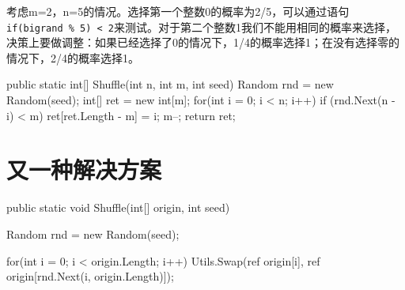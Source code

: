 考虑m=2，n=5的情况。选择第一个整数0的概率为2/5，可以通过语句\lstinline!if(bigrand % 5) < 2!来测试。对于第二个整数1我们不能用相同的概率来选择，决策上要做调整：如果已经选择了0的情况下，1/4的概率选择1；在没有选择零的情况下，2/4的概率选择1。

\begin{CSharp}
        public static int[] Shuffle(int n, int m, int seed)
        {
            Random rnd = new Random(seed);
            int[] ret = new int[m];
            for(int i = 0; i < n; i++)
            {
                if (rnd.Next(n - i) < m)
                {
                    ret[ret.Length - m] = i;
                    m--;
                }
            }
            return ret;
        }
\end{CSharp}        


\section{又一种解决方案}

\begin{CSharp}
        public static void Shuffle(int[] origin, int seed)
        {
            Random rnd = new Random(seed);

            for(int i = 0; i < origin.Length; i++)
            {
                Utils.Swap(ref origin[i], ref origin[rnd.Next(i, origin.Length)]);
            }
        }
\end{CSharp}